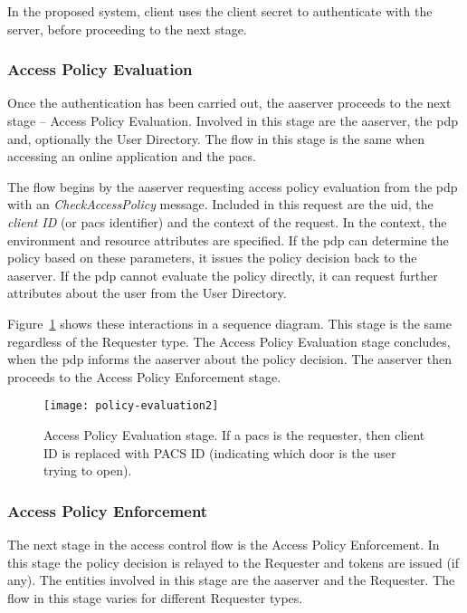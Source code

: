 In the proposed system, client uses the client secret to authenticate with the server, before proceeding to the next stage.

\subsubsection{Access Policy Evaluation}
Once the authentication has been carried out, the \acrshort{aaserver} proceeds to the next stage -- Access Policy Evaluation. Involved in this stage are the \acrshort{aaserver}, the \acrshort{pdp} and, optionally the User Directory. The flow in this stage is the same when accessing an online application and the \acrshort{pacs}.

The flow begins by the \acrshort{aaserver} requesting access policy evaluation from the \acrshort{pdp} with an \textit{CheckAccessPolicy} message. Included in this request are the \acrshort{uid}, the \textit{client ID} (or \acrshort{pacs} identifier) and the context of the request. In the context, the environment and resource attributes are specified. If the \acrshort{pdp} can determine the policy based on these parameters, it issues the policy decision back to the \acrshort{aaserver}. If the \acrshort{pdp} cannot evaluate the policy directly, it can request further attributes about the user from the User Directory.

Figure~\ref{fig:policy-evaluation} shows these interactions in a sequence diagram. This stage is the same regardless of the Requester type. The Access Policy Evaluation stage concludes, when the \acrshort{pdp} informs the \acrshort{aaserver} about the policy decision. The \acrshort{aaserver} then proceeds to the Access Policy Enforcement stage.

\begin{figure}[H]
    \centering
    \texttt{[image: policy-evaluation2]}
    \caption{Access Policy Evaluation stage. If a \acrshort{pacs} is the requester, then client ID is replaced with PACS ID (indicating which door is the user trying to open).}
    \label{fig:policy-evaluation}
\end{figure}

\subsubsection{Access Policy Enforcement}
The next stage in the access control flow is the Access Policy Enforcement. In this stage the policy decision is relayed to the Requester and tokens are issued (if any). The entities involved in this stage are the \acrshort{aaserver} and the Requester. The flow in this stage varies for different Requester types.

